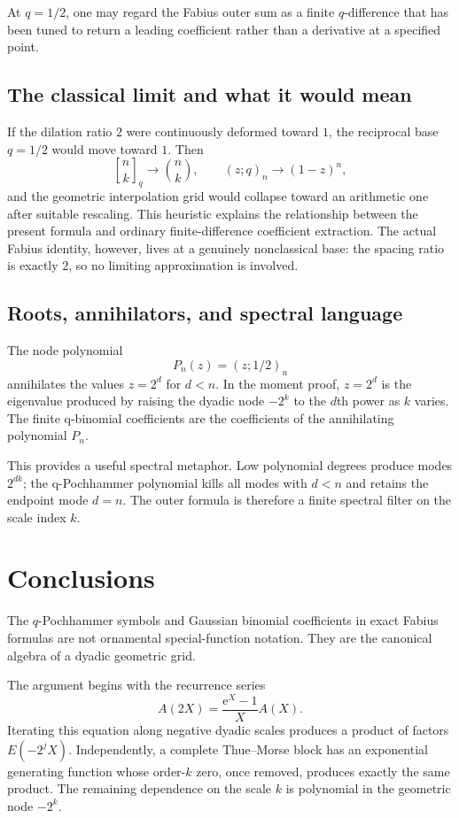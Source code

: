 \documentclass[11pt,oneside]{article}
\theoremstyle{definition}
\theoremstyle{remark}
\newcommand{\qpoch}[3]{\left(#1;#2\right)_{#3}}
\newcommand{\qbinom}[3]{{\genfrac{[}{]}{0pt}{}{#1}{#2}}_{#3}}
\newcommand{\e}{\mathrm e}
\begin{document}
At $q=1/2$, one may regard the Fabius outer sum as a finite $q$-difference
that has been tuned to return a leading coefficient rather than a derivative
at a specified point.

\subsection{The classical limit and what it would mean}

If the dilation ratio $2$ were continuously deformed toward $1$, the
reciprocal base $q=1/2$ would move toward $1$.  Then
\[
 \qbinom{n}{k}{q}\longrightarrow\binom nk,
 \qquad
 \qpoch{z}{q}{n}\longrightarrow(1-z)^n,
\]
and the geometric interpolation grid would collapse toward an arithmetic
one after suitable rescaling.  This heuristic explains the relationship
between the present formula and ordinary finite-difference coefficient
extraction.  The actual Fabius identity, however, lives at a genuinely
nonclassical base: the spacing ratio is exactly $2$, so no limiting
approximation is involved.

\subsection{Roots, annihilators, and spectral language}

The node polynomial
\[
 P_n(z)=\qpoch{z}{1/2}{n}
\]
annihilates the values $z=2^d$ for $d<n$.  In the moment proof,
$z=2^d$ is the eigenvalue produced by raising the dyadic node $-2^k$ to the
$d$th power as $k$ varies.  The finite q-binomial coefficients are the
coefficients of the annihilating polynomial $P_n$.

This provides a useful spectral metaphor.  Low polynomial degrees produce
modes $2^{dk}$; the q-Pochhammer polynomial kills all modes with $d<n$ and
retains the endpoint mode $d=n$.  The outer formula is therefore a finite
spectral filter on the scale index $k$.

\section{Conclusions}

The $q$-Pochhammer symbols and Gaussian binomial coefficients in exact
Fabius formulas are not ornamental special-function notation.  They are the
canonical algebra of a dyadic geometric grid.

The argument begins with the recurrence series
\[
 A(2X)=\frac{\e^X-1}{X}A(X).
\]
Iterating this equation along negative dyadic scales produces a product of
factors $E(-2^jX)$.  Independently, a complete Thue--Morse block has an
exponential generating function whose order-$k$ zero, once removed, produces
exactly the same product.  The remaining dependence on the scale $k$ is
polynomial in the geometric node $-2^k$.
\end{document}

